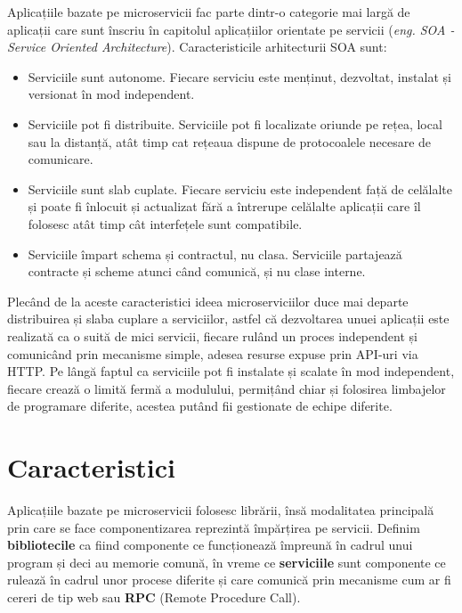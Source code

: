\documentclass[12pt, a4paper, oneside, romanian]{teza-upb}
\begin{document}
Aplicațiile bazate pe microservicii fac parte dintr-o categorie mai largă de aplicații care sunt înscriu în capitolul aplicațiilor orientate pe servicii (\textit{eng. SOA - Service Oriented Architecture}). Caracteristicile arhitecturii SOA sunt:
\begin{itemize}
 \item Serviciile sunt autonome. Fiecare serviciu este menținut, dezvoltat, instalat și versionat în mod independent.
 \item Serviciile pot fi distribuite. Serviciile pot fi localizate oriunde pe rețea, local sau la distanță, atât timp cat rețeaua dispune de protocoalele necesare de comunicare.
 \item Serviciile sunt slab cuplate. Fiecare serviciu este independent față de celălalte și poate fi înlocuit și actualizat fără a întrerupe celălalte aplicații care îl folosesc atât timp cât interfețele sunt compatibile.
 \item Serviciile împart schema și contractul, nu clasa. Serviciile partajează contracte și scheme atunci când comunică, și nu clase interne.
\end{itemize}


Plecând de la aceste caracteristici ideea microserviciilor duce mai departe distribuirea și slaba cuplare a serviciilor, astfel că dezvoltarea unuei aplicații este realizată ca o suită de mici servicii, fiecare rulând un proces independent și comunicând prin mecanisme simple, adesea resurse expuse prin API-uri via HTTP. Pe lângă faptul ca serviciile pot fi instalate și scalate în mod independent, fiecare crează o limită fermă a modulului, permițând chiar și folosirea limbajelor de programare diferite, acestea putând fii gestionate de echipe diferite.

\section{Caracteristici}

Aplicațiile bazate pe microservicii folosesc librării, însă modalitatea principală prin care se face componentizarea reprezintă împărțirea pe servicii. Definim \textbf{bibliotecile} ca fiind componente ce funcționează împreună în cadrul unui program și deci au memorie comună, în vreme ce \textbf{serviciile} sunt componente ce rulează în cadrul unor procese diferite și care comunică prin mecanisme cum ar fi cereri de tip web sau \textbf{RPC} (Remote Procedure Call).
\end{document}
